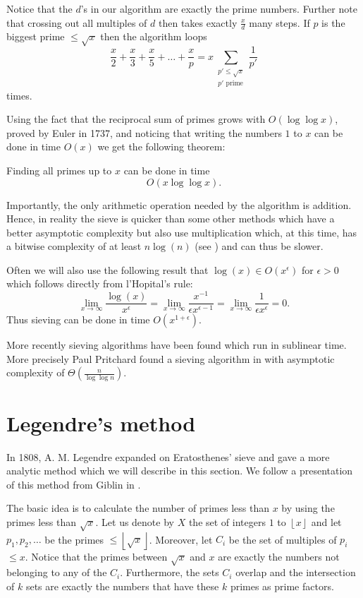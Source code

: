 Notice that the $d$'s in our algorithm are exactly the prime numbers. Further note 
that crossing out all multiples of $d$ then takes exactly $\frac{x}{d}$ many steps. If $p$ is 
the biggest prime $\leq \sqrt{x} $ then the algorithm loops 
\[
	\frac{x}{2} + \frac{x}{3} + \frac{x}{5} + \ldots + \frac{x}{p} = x \sum_{\substack{p' \leq \sqrt{x}\\ p' \text{ prime}}} \frac{1}{p'}
\] 
times.

Using the fact that the reciprocal sum of primes grows with $O(\log \log x)$, proved by Euler in 1737, and 
noticing that writing the numbers $1$ to $x$ can be done in time $O(x)$ we get the following theorem:
 \begin{theorem}
	Finding all primes up to $x$ can be done in time
	\[
		O(x \log \log x)
	.\] 
\end{theorem}

\begin{remark}
Importantly, the only arithmetic operation needed by the algorithm is addition.
Hence, in reality the sieve is quicker than some other methods which have a better
asymptotic complexity but also use multiplication which, at this time, has a bitwise complexity of at least $n \log(n)$ (see \cite{harvey21}) and can thus be slower.
\end{remark}

Often we will also use the following result that 
$\log(x) \in O(x^{\epsilon})$ for $\epsilon > 0$ which follows directly from l'Hopital's rule:
\[
	\lim_{x \to \infty} \frac{\log(x)}{x^{\epsilon}} = \lim_{x \to \infty} \frac{x^{-1}}{\epsilon x^{\epsilon - 1}} = \lim_{x \to \infty} \frac{1}{\epsilon x^{\epsilon}} = 0
.\] 
Thus sieving can be done in time $O(x^{1+\epsilon})$.

More recently sieving algorithms have been found which run in sublinear time. More precisely Paul Pritchard found a sieving algorithm in \cite{pritchard81} with asymptotic complexity of
$\Theta(\frac{n}{\log\log n})$.

\section{Legendre's method}
\label{sec:legendre}
In 1808, A. M. Legendre expanded on Eratosthenes' sieve and gave a more analytic method which we will describe in this section.
We follow a presentation of this method from Giblin in \cite{giblin93}.

The basic idea is to calculate the number of primes less than $x$ by using the primes less than $\sqrt{x}$.
Let us denote by $X$ the set of integers $1$ to $\left\lfloor x \right\rfloor$
and let $p_1,p_2,\ldots$ be the primes $\leq \left\lfloor \sqrt{x}  \right\rfloor$.
Moreover, let $C_{i}$ be the set of multiples of $p_{i}$ $\leq x$.
Notice that the primes between $\sqrt{x}$ and $x$ are exactly the numbers not belonging to any of the $C_{i}$.
Furthermore, the sets $C_{i}$ overlap and the intersection of $k$ sets are exactly the numbers that have
these $k$ primes as prime factors.

